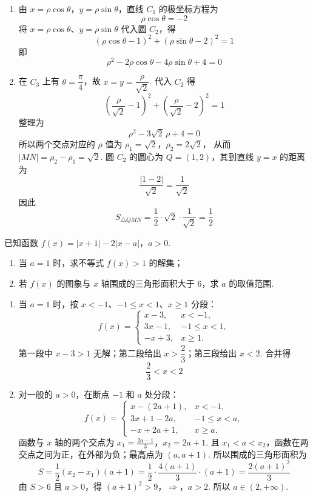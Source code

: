 \begin{solution}
\begin{enumerate}
\item 由 \(x=\rho\cos\theta\)，\(y=\rho\sin\theta\)，直线 \(C_1\) 的极坐标方程为
\[
\rho\cos\theta=-2
\]
将 \(x=\rho\cos\theta\)、\(y=\rho\sin\theta\) 代入圆 \(C_2\)，得
\[
(\rho\cos\theta-1)^2+(\rho\sin\theta-2)^2=1
\]
即
\[
\rho^2-2\rho\cos\theta-4\rho\sin\theta+4=0
\]

\item 在 \(C_3\) 上有 \(\theta=\dfrac{\pi}{4}\)，故 \(x=y=\dfrac{\rho}{\sqrt2}\). 代入 \(C_2\) 得
\[
\left(\frac{\rho}{\sqrt2}-1\right)^2+
\left(\frac{\rho}{\sqrt2}-2\right)^2=1
\]
整理为
\[
\rho^2-3\sqrt2\,\rho+4=0
\]
所以两个交点对应的 \(\rho\) 值为
\(\rho_1=\sqrt2\)，\(\rho_2=2\sqrt2\)，
从而 \(|MN|=\rho_2-\rho_1=\sqrt2\). 圆 \(C_2\) 的圆心为 \(Q=(1,2)\)，其到直线 \(y=x\) 的距离为
\[
\frac{|1-2|}{\sqrt2}=\frac1{\sqrt2}
\]
因此
\[
S_{\triangle QMN}
=\frac12\cdot\sqrt2\cdot\frac1{\sqrt2}
=\frac12
\]
\end{enumerate}
\end{solution}

\begin{problem}
已知函数 \( f(x) = |x + 1| - 2|x - a| \)，\( a > 0 \).

\begin{enumerate}
\item 当 \(a = 1\) 时，求不等式 \(f(x) > 1\) 的解集；
\item 若 \( f(x) \) 的图象与 \( x \) 轴围成的三角形面积大于 \(6\)，求 \( a \) 的取值范围.
\end{enumerate}
\end{problem}

\begin{solution}
\begin{enumerate}
\item 当 \(a=1\) 时，按 \(x<-1\)、\(-1\leqslant x<1\)、\(x\geqslant1\) 分段：
\[
f(x)=
\begin{cases}
x-3,&x<-1,\\
3x-1,&-1\leqslant x<1,\\
-x+3,&x\geqslant1.
\end{cases}
\]
第一段中 \(x-3>1\) 无解；第二段给出 \(x>\dfrac23\)；第三段给出 \(x<2\). 合并得
\[
\frac23<x<2
\]

\item 对一般的 \(a>0\)，在断点 \(-1\) 和 \(a\) 处分段：
\[
f(x)=
\begin{cases}
x-(2a+1),&x<-1,\\
3x+1-2a,&-1\leqslant x<a,\\
-x+2a+1,&x\geqslant a.
\end{cases}
\]
函数与 \(x\) 轴的两个交点为
\(x_1=\frac{2a-1}{3}\)，\(x_2=2a+1\).
且 \(x_1<a<x_2\)，函数在两交点之间为正，在外部为负；最高点为 \((a,a+1)\). 所以围成的三角形面积为
\[
S=\frac12(x_2-x_1)(a+1)
=\frac12\cdot\frac{4(a+1)}3\cdot(a+1)
=\frac{2(a+1)^2}{3}
\]
由 \(S>6\) 且 \(a>0\)，得
\((a+1)^2>9\)，\(\Longrightarrow\)，\(a>2\).
所以 \(a\in(2,+\infty)\).
\end{enumerate}
\end{solution}
